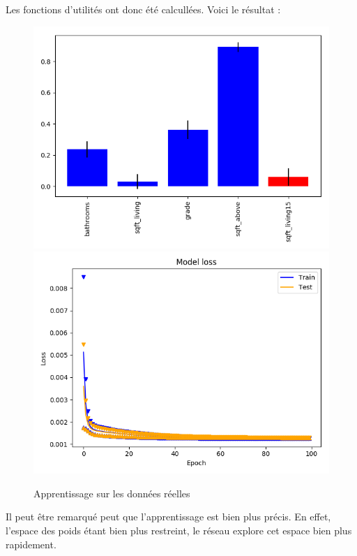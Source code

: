 Les fonctions d'utilités ont donc été calcullées.
Voici le résultat :
\begin{figure}[H]
    \center
    \includegraphics[height=\petit]{pict/real/resut.png}
    \includegraphics[height=\petit]{pict/real/learnut.png}
	\caption{Apprentissage sur les données réelles}
	\label{fig:ut1_100_100}
\end{figure}
Il peut être remarqué peut que l'apprentissage est bien plus précis.
En effet, l'espace des poids étant bien plus restreint,
le réseau explore cet espace bien plus rapidement.


